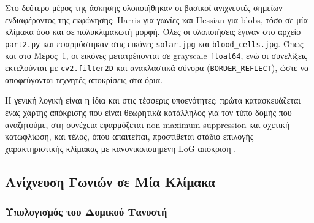 \documentclass[12pt, a4paper]{article}
\begin{document}
Στο δεύτερο μέρος της άσκησης υλοποιήθηκαν οι βασικοί ανιχνευτές σημείων
ενδιαφέροντος της εκφώνησης: Harris για γωνίες και Hessian για blobs, τόσο
σε μία κλίμακα όσο και σε πολυκλιμακωτή μορφή. Όλες οι υλοποιήσεις έγιναν στο
αρχείο \texttt{part2.py} και εφαρμόστηκαν στις εικόνες \texttt{solar.jpg} και
\texttt{blood\_cells.jpg}. Όπως και στο Μέρος~1, οι εικόνες μετατρέπονται σε
grayscale \texttt{float64}, ενώ οι συνελίξεις εκτελούνται με
\texttt{cv2.filter2D} και ανακλαστικά σύνορα (\texttt{BORDER\_REFLECT}), ώστε
να αποφεύγονται τεχνητές αποκρίσεις στα όρια.

Η γενική λογική είναι η ίδια και στις τέσσερις υποενότητες: πρώτα κατασκευάζεται
ένας χάρτης απόκρισης που είναι θεωρητικά κατάλληλος για τον τύπο δομής που
αναζητούμε, στη συνέχεια εφαρμόζεται non-maximum suppression και σχετική
κατωφλίωση, και τέλος, όπου απαιτείται, προστίθεται στάδιο επιλογής
χαρακτηριστικής κλίμακας με κανονικοποιημένη LoG απόκριση \cite{maragos2005features}.

\subsection{Ανίχνευση Γωνιών σε Μία Κλίμακα}

\subsubsection{Υπολογισμός του Δομικού Τανυστή}
\end{document}
